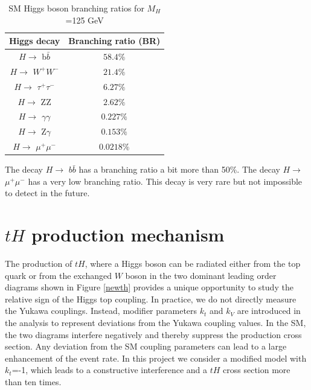 \begin{table}[ht] 
\caption[SM Higgs boson branching ratios for $M_H$ =125 GeV]{SM Higgs boson branching ratios for $M_H$ =125 GeV \protect \cite{pd}}
\centering
\begin{tabular}{|c|c|}
\hline
Higgs decay & Branching ratio (BR)\\
\hline
$H \rightarrow$ b$\bar{b}$ &$58.4\%$ \\
\hline
 $H \rightarrow$ $W^+W^-$ &$21.4\%$ \\
\hline
$H \rightarrow$ $\tau^+ \tau^-$ & $6.27\%$\\
\hline
$H \rightarrow$ ZZ &$2.62\%$\\
\hline
$H \rightarrow$ $\gamma\gamma$ &$0.227\%$\\
\hline
$H \rightarrow$ Z$\gamma$ &$0.153\%$\\
\hline
$H \rightarrow$ $\mu^+\mu^-$ &$0.0218\%$\\
\hline
\end{tabular}
\label{higgs1}
\end{table}
The decay $H \rightarrow$ $b\bar{b}$ has a branching ratio a bit more than 50$\%$. The decay $H \rightarrow$ $\mu^+\mu^-$ has a very low branching ratio. This decay is very rare but not impossible to detect in the future. %

\section{$tH$ production mechanism}
The production of $tH$, where a Higgs boson can be radiated
either from the top quark or from the exchanged $W$ boson in the two dominant leading order
diagrams shown in Figure \ref{newth} provides a unique opportunity to study the relative sign of the Higgs top coupling.
In practice, we do not directly measure the Yukawa couplings. Instead, modifier parameters $k_t$ and $k_V$ are introduced in the analysis to represent deviations from the Yukawa coupling values. 
In the SM, the two diagrams interfere negatively and thereby suppress the production cross section.
Any deviation from the SM coupling parameters can lead to a large enhancement of the event rate. 
In this project we consider a modified model with $k_t$=-1, which leads to a constructive interference and a $tH$ cross section more than ten times. 

